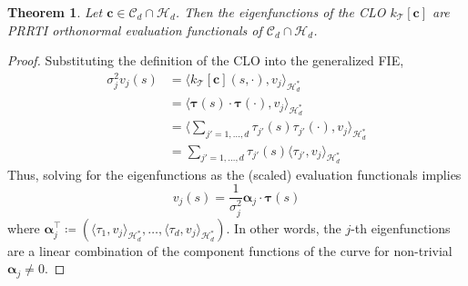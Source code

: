 \documentclass[pdflatex,iicol]{sn-jnl}%
\theoremstyle{thmstyleone}%
\newtheorem{theorem}{Theorem}%
\theoremstyle{thmstyletwo}%
\theoremstyle{thmstylethree}%
\begin{document}
\begin{theorem} \label{theorem:eigfuncs}
    Let $\boldsymbol{c} \in \mathcal{C}_d \cap \mathcal{H}_d$. Then the eigenfunctions of the CLO $k_{\mathcal{T}}[\boldsymbol{c}]$ are PRRTI orthonormal evaluation functionals of $\mathcal{C}_d \cap \mathcal{H}_d$.
\end{theorem}

\begin{proof}
    Substituting the definition of the CLO into the generalized FIE,
    \begin{align}
        \sigma_j^2v_j(s) &= \langle k_{\mathcal{T}}[\boldsymbol{c}](s,\cdot), v_j\rangle_{\mathcal{H}^*_d}\\ \nonumber
        &= \langle \boldsymbol{\tau}(s)\cdot \boldsymbol{\tau}(\cdot),  v_j\rangle_{\mathcal{H}^*_d} \\ \nonumber
        &=\langle \sum_{j'=1,\dots,d}\tau_{j'}(s)\tau_{j'}(\cdot), v_j\rangle_{\mathcal{H}^*_d}\\ \nonumber           &=\sum_{j'=1,\dots,d}\tau_{j'}(s)\langle \tau_{j'}, v_j \rangle_{\mathcal{H}^*_d} \nonumber           
    \end{align}
    Thus, solving for the eigenfunctions as the (scaled) evaluation functionals implies
    \begin{equation} \label{equ:eigfunc}
        v_j(s) = \frac{1}{\sigma^2_j}\boldsymbol{\alpha}_j \cdot \boldsymbol{\tau}(s)
    \end{equation}
    where $\boldsymbol{\alpha}^{\top}_j \coloneqq (\langle \tau_1,v_j\rangle_{\mathcal{H}^*_d},\dots,\langle \tau_d,v_j\rangle_{\mathcal{H}^*_d})$. In other words, the $j$-th eigenfunctions are a linear combination of the component functions of the curve for non-trivial $\boldsymbol{\alpha}_j \neq 0$. 
    

\end{proof}
\end{document}
